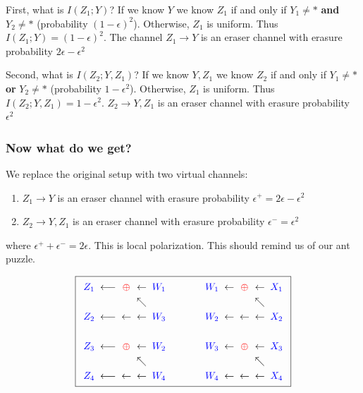 \documentclass{article}
\begin{document}
First, what is $I(Z_1; Y)$? If we know $Y$ we know $Z_1$ if and only if $Y_1 \neq \ast$ \textbf{and} $Y_2 \neq \ast$ (probability $(1-\epsilon)^2$). Otherwise, $Z_1$ is uniform. Thus $I(Z_1; Y)=(1-\epsilon)^2$. The channel $Z_1\to Y$ is an eraser channel with erasure probability $2\epsilon - \epsilon^2$

Second, what is $I(Z_2; Y, Z_1)$? If we know $Y,Z_1$ we know $Z_2$ if and only if $Y_1\neq \ast$ \textbf{or} $Y_2\neq \ast$ (probability $1-\epsilon^2$). Otherwise, $Z_1$ is uniform. Thus $I(Z_2;Y,Z_1)=1-\epsilon^2$. $Z_2\to Y, Z_1$ is an eraser channel with erasure probability $\epsilon^2$

\subsubsection{Now what do we get?}

We replace the original setup with two virtual channels:
\begin{enumerate}
    \item $Z_1\to Y$ is an eraser channel with erasure probability $\epsilon^+ =2\epsilon - \epsilon^2$
    \item $Z_2\to Y, Z_1$ is an eraser channel with erasure probability $\epsilon^- =\epsilon^2$
\end{enumerate}
where $\epsilon^+ + \epsilon^- = 2\epsilon$. This is local polarization. This should remind us of our ant puzzle.

\[
\boxed{
\renewcommand{\arraystretch}{1.25}
\begin{array}{c@{\;\;}c@{\;\;}c@{\;\;}c@{\;\;}c@{\qquad\qquad}c@{\;\;}c@{\;\;}c@{\;\;}c@{\;\;}c}
{\color{blue}Z_1} & \longleftarrow & {\color{red}\oplus} & \leftarrow & {\color{blue}W_1} &
{\color{blue}W_1} & \leftarrow & {\color{red}\oplus} & \leftarrow & {\color{blue}X_1} \\
 & & & \nwarrow & & & & & \nwarrow & \\
{\color{blue}Z_2} & \longleftarrow & \leftarrow & \leftarrow & {\color{blue}W_3} &
{\color{blue}W_2} & \leftarrow & \leftarrow & \leftarrow & {\color{blue}X_2} \\
 & & & & & & & & & \\
{\color{blue}Z_3} & \longleftarrow & {\color{red}\oplus} & \leftarrow & {\color{blue}W_2} &
{\color{blue}W_3} & \leftarrow & {\color{red}\oplus} & \leftarrow & {\color{blue}X_3} \\
 & & & \nwarrow & & & & & \nwarrow & \\
{\color{blue}Z_4} & \longleftarrow & \leftarrow & \leftarrow & {\color{blue}W_4} &
{\color{blue}W_4} & \leftarrow & \leftarrow & \leftarrow & {\color{blue}X_4}
\end{array}
}
\]
\end{document}
